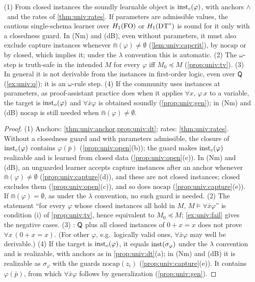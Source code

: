 \begin{proposition}\label{prop:univ:learner}
\textup{(1)} From closed instances the soundly learnable object is $\mathrm{inst}_{c}(\varphi)$, with anchors \evR$\wedge$\evD\ and the rates of \cref{thm:univ:rates}. If parameters are admissible values, the cautious single-schema learner over $H_{1}(\mathrm{FO})$ or $H_{1}(\mathrm{DT}^{\circ})$ is sound for it only with a closedness guard. In (Nm) and (dB), even without parameters, it must also exclude capture instances whenever $\Cap(\varphi)\neq\emptyset$ (\cref{lem:univ:capcrit}), by $\mathrm{nocap}$ or by $\mathrm{closed}$, which implies it; under the $\lambda$ convention this is automatic.
\textup{(2)} The $\omega$-step is truth-safe in the intended $M$ for every $\varphi$ iff $M_0\preceq M$ (\cref{prop:univ:tv}).
\textup{(3)} In general it is not derivable from the instances in first-order logic, even over $\mathsf{Q}$ (\cref{ex:univ:q}); it is an $\omega$-rule step.
\textup{(4)} If the community uses instances at parameters, as proof-assistant practice does when it applies $\forall x,\,\varphi\,x$ to a variable, the target is $\mathrm{inst}_{o}(\varphi)$ and $\forall\bar x\varphi$ is obtained soundly (\cref{prop:univ:gen}); in (Nm) and (dB) $\mathrm{nocap}$ is still needed when $\Cap(\varphi)\neq\emptyset$.
\end{proposition}

\begin{proof}
(1) Anchors: \cref{thm:univ:anchor,prop:univ:dt}; rates: \cref{thm:univ:rates}. Without a closedness guard and with parameters admissible, the closure of $\mathrm{inst}_{c}(\varphi)$ contains $\varphi(\bar p)$ (\cref{prop:univ:open}(b)); the guard makes $\mathrm{inst}_{c}(\varphi)$ realizable and is learned from closed data (\cref{prop:univ:open}(c)). In (Nm) and (dB), an unguarded learner accepts capture instances after an anchor whenever $\Cap(\varphi)\neq\emptyset$ (\cref{prop:univ:capture}(d)), and these are not closed instances; $\mathrm{closed}$ excludes them (\cref{prop:univ:open}(c)), and so does $\mathrm{nocap}$ (\cref{prop:univ:capture}(e)). If $\Cap(\varphi)=\emptyset$, as under the $\lambda$ convention, no such guard is needed.
(2) The statement ``for every $\varphi$ whose closed instances all hold in $M$, $M\models\forall\bar x\varphi$'' is condition (i) of \cref{prop:univ:tv}, hence equivalent to $M_0\preceq M$; \cref{ex:univ:fail} gives the negative cases.
(3) : $\mathsf{Q}$ plus all closed instances of $0+x=x$ does not prove $\forall x\,(0+x=x)$. (For other $\varphi$, e.g.\ logically valid ones, $\forall\bar x\varphi$ may well be derivable.)
(4) If the target is $\mathrm{inst}_{o}(\varphi)$, it equals $\mathrm{inst}(\sigma_\varphi)$ under the $\lambda$ convention and is realizable, with anchors as in \cref{prop:univ:dt}(a); in (Nm) and (dB) it is realizable as $\sigma_\varphi$ with the guards $\mathrm{nocap}(z_i)$ (\cref{prop:univ:capture}(e)). It contains $\varphi(\bar p)$, from which $\forall\bar x\varphi$ follows by generalization (\cref{prop:univ:gen}).
\end{proof}

